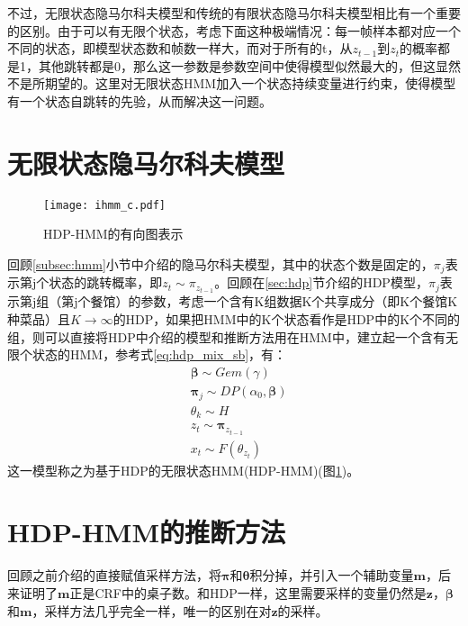 不过，无限状态隐马尔科夫模型和传统的有限状态隐马尔科夫模型相比有一个重要的区别。由于可以有无限个状态，考虑下面这种极端情况：每一帧样本都对应一个不同的状态，即模型状态数和帧数一样大，而对于所有的t，从$z_{t-1}$到$z_t$的概率都是1，其他跳转都是0，那么这一参数是参数空间中使得模型似然最大的，但这显然不是所期望的。这里对无限状态HMM加入一个状态持续变量进行约束，使得模型有一个状态自跳转的先验，从而解决这一问题。


\section{无限状态隐马尔科夫模型}
\begin{figure}
  \texttt{[image: ihmm\_c.pdf]}\\
  \caption{HDP-HMM的有向图表示}\label{fig:hdp_hmm}
  \vspace{-12pt}
\end{figure}
回顾\ref{subsec:hmm}小节中介绍的隐马尔科夫模型，其中的状态个数是固定的，$\pi_j$表示第j个状态的跳转概率，即$z_t \sim \pi_{z_{t-1}}$。回顾在\ref{sec:hdp}节介绍的HDP模型，$\pi_j$表示第j组（第j个餐馆）的参数，考虑一个含有K组数据K个共享成分（即K个餐馆K种菜品）且$K \rightarrow \infty$的HDP，如果把HMM中的K个状态看作是HDP中的K个不同的组，则可以直接将HDP中介绍的模型和推断方法用在HMM中，建立起一个含有无限个状态的HMM，参考式\eqref{eq:hdp_mix_sb}，有：
\begin{equation}
\begin{split}
& {\bm \beta} \sim Gem(\gamma)\\
& {\bm \pi}_j \sim DP(\alpha_0,{\bm \beta})\\
& \theta_k \sim H\\
& z_t \sim {\bm \pi}_{z_{t-1}}\\
& x_t \sim F(\theta_{z_t}) 
\end{split}
\label{eq:hdp_hmm_sb}
\end{equation}
这一模型称之为基于HDP的无限状态HMM(HDP-HMM)(图\ref{fig:hdp_hmm})。

\section{HDP-HMM的推断方法}
回顾之前介绍的直接赋值采样方法，将${\bm \pi}$和${\bm \theta}$积分掉，并引入一个辅助变量${\bm m}$，后来证明了${\bm m}$正是CRF中的桌子数。和HDP一样，这里需要采样的变量仍然是${\bm z}$，${\bm \beta}$和${\bm m}$，采样方法几乎完全一样，唯一的区别在对${\bm z}$的采样。


